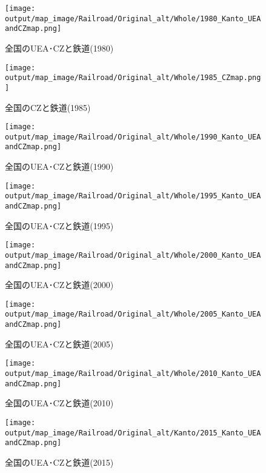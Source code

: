 \documentclass{ltjsarticle}
\begin{document}
\begin{figure}[pbth]
  \centering
  \texttt{[image: output/map\_image/Railroad/Original\_alt/Whole/1980\_Kanto\_UEAandCZmap.png]}
  \caption{\label{alt:1980:allCZandUEA:Rail}全国のUEA･CZと鉄道(1980)}
\end{figure}


\begin{figure}[pbth]
  \centering
  \texttt{[image: output/map\_image/Railroad/Original\_alt/Whole/1985\_CZmap.png]}
  \caption{\label{alt:1985:allCZandUEA:Rail}全国のCZと鉄道(1985)}
\end{figure}


\begin{figure}[pbth]
  \centering
  \texttt{[image: output/map\_image/Railroad/Original\_alt/Whole/1990\_Kanto\_UEAandCZmap.png]}
  \caption{\label{alt:1990:allCZandUEA:Rail}全国のUEA･CZと鉄道(1990)}
\end{figure}


\begin{figure}[pbth]
  \centering
  \texttt{[image: output/map\_image/Railroad/Original\_alt/Whole/1995\_Kanto\_UEAandCZmap.png]}
  \caption{\label{alt:1995:allCZandUEA:Rail}全国のUEA･CZと鉄道(1995)}
\end{figure}


\begin{figure}[pbth]
  \centering
  \texttt{[image: output/map\_image/Railroad/Original\_alt/Whole/2000\_Kanto\_UEAandCZmap.png]}
  \caption{\label{alt:2000:allCZandUEA:Rail}全国のUEA･CZと鉄道(2000)}
\end{figure}


\begin{figure}[pbth]
  \centering
  \texttt{[image: output/map\_image/Railroad/Original\_alt/Whole/2005\_Kanto\_UEAandCZmap.png]}
  \caption{\label{alt:2005:allCZandUEA:Rail}全国のUEA･CZと鉄道(2005)}
\end{figure}


\begin{figure}[pbth]
  \centering
  \texttt{[image: output/map\_image/Railroad/Original\_alt/Whole/2010\_Kanto\_UEAandCZmap.png]}
  \caption{\label{alt:2010:allCZandUEA:Rail}全国のUEA･CZと鉄道(2010)}
\end{figure}


\begin{figure}[pbth]
  \centering
  \texttt{[image: output/map\_image/Railroad/Original\_alt/Kanto/2015\_Kanto\_UEAandCZmap.png]}
  \caption{\label{alt:2015:allCZandUEA:Rail}全国のUEA･CZと鉄道(2015)}
\end{figure}
\end{document}

